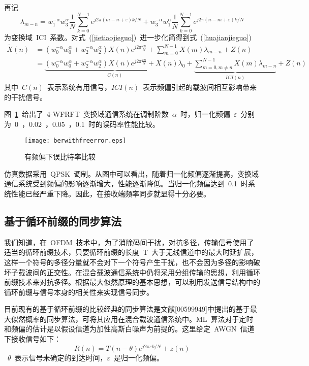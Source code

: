 再记
\begin{equation}
{\lambda _{m - n}} = w_1^{ - \alpha }w_3^\alpha \frac{1}{N}\sum\limits_{k = 0}^{N - 1} {{e^{j2\pi (m - n + \varepsilon )k/N}}}  + w_3^{ - \alpha }w_1^\alpha \frac{1}{N}\sum\limits_{k = 0}^{N - 1} {{e^{j2\pi (n - m + \varepsilon )k/N}}}
\end{equation}
为变换域~ICI~系数。对式~(\ref{jietiaojieguo})~进一步化简得到式~(\ref{huajianjieguo})~
\begin{align}\label{huajianjieguo}
\tilde X(n) &= (w_0^{ - \alpha }w_0^\alpha  + w_2^{ - \alpha }w_2^\alpha )X(n){e^{j2\pi \frac{{\varepsilon n}}{N}}} + \sum\limits_{m = 0}^{N - 1} {X(m){\lambda _{m - n}}}  + Z(n) \\
&= \underbrace {(w_0^{ - \alpha }w_0^\alpha  + w_2^{ - \alpha }w_2^\alpha )X(n){e^{j2\pi \frac{{\varepsilon n}}{N}}} + X(n){\lambda _0}}_{C(n)} + \underbrace {\sum\limits_{m = 0,m \ne n}^{N - 1} {X(m){\lambda _{m - n}}} }_{ICI(n)} + Z(n)
\end{align}
其中~$C(n)$~表示系统有用信号，$ICI(n)$~表示频偏引起的载波间相互影响带来的干扰信号。

图~\ref{berpinpian}~给出了~4-WFRFT~变换域通信系统在调制阶数~$\alpha$~时，归一化频偏~$\varepsilon$~分别为~0~，0.02~，0.05~，0.1~时的误码率性能比较。
\begin{figure}[htbp]
\centering
\texttt{[image: berwithfreerror.eps]}
\caption{有频偏下误比特率比较}\vspace{-1em}\label{berpinpian}
\end{figure}
仿真数据采用~QPSK~调制。从图中可以看出，随着归一化频偏逐渐提高，变换域通信系统受到频偏的影响逐渐增大，性能逐渐降低。当归一化频偏达到~0.1~时系统性能已经严重下降。因此，在接收端频率同步就显得十分必要。


\subsection{基于循环前缀的同步算法}


我们知道，在~OFDM~技术中，为了消除码间干扰，对抗多径，传输信号使用了适当的循环前缀技术，只要循环前缀的长度~T~大于无线信道中的最大时延扩展，这样一个符号的多径分量就不会对下一个符号产生干扰，也不会因为多径的影响破坏子载波间的正交性。在混合载波通信系统中仍将采用分组传输的思想，利用循环前缀技术来对抗多径。根据最大似然原理的基本思想，可以利用发送信号结构中的循环前缀与信号本身的相关性来实现信号同步。

目前现有的基于循环前缀的比较经典的同步算法是文献[00599949]中提出的基于最大似然概率的同步算法，可将其应用在混合载波通信系统中。ML~算法对于定时和频偏的估计是以假设信道为加性高斯白噪声为前提的。这里给定~AWGN~信道下接收信号如下：
\begin{equation}
R(n) = T(n-\theta){e^{j2\pi \varepsilon k/N} } + z(n)
\end{equation}
~$\theta$~表示信号未确定的到达时间，$\varepsilon$~是归一化频偏。

